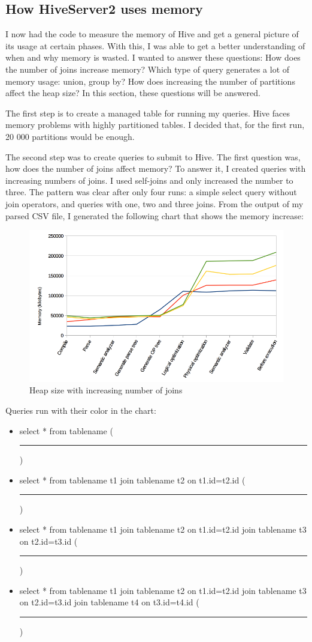 \subsection{How HiveServer2 uses memory}
I now had the code to measure the memory of Hive and get a general picture of its usage at certain phases. With this, I was able to get a better understanding of when and why memory is wasted. I wanted to answer these questions: How does the number of joins increase memory? Which type of query generates a lot of memory usage: union, group by? How does increasing the number of partitions affect the heap size? In this section, these questions will be answered.

The first step is to create a managed table for running my queries. Hive faces memory problems with highly partitioned tables. I decided that, for the first run, 20 000 partitions would be enough. 

The second step was to create queries to submit to Hive. The first question was, how does the number of joins affect memory? To answer it, I created queries with increasing numbers of joins. I used self-joins and only increased the number to three. The pattern was clear after only four runs: a simple select query without join operators, and queries with one, two and three joins. From the output of my parsed CSV file, I generated the following chart that shows the memory increase:

\begin{figure}[H]
	\includegraphics[width=150mm, keepaspectratio]{figures/hs2_joins_memory.png}
	\centering
	\caption{Heap size with increasing number of joins}
\end{figure}

\noindent Queries run with their color in the chart:
\begin{itemize}
	\item select * from tablename (\textcolor{blue}{\rule{2 cm}{2pt} })
	\item select * from tablename t1 join tablename t2 on t1.id=t2.id (\textcolor{orange}{\rule{2 cm}{2pt} })
	\item select * from tablename t1 join tablename t2 on t1.id=t2.id join tablename t3 on t2.id=t3.id (\textcolor{yellow}{\rule{2 cm}{2pt} })
	\item select * from tablename t1 join tablename t2 on t1.id=t2.id join tablename t3 on t2.id=t3.id join tablename t4 on t3.id=t4.id (\textcolor{green}{\rule{2 cm}{2pt} })
\end{itemize}

